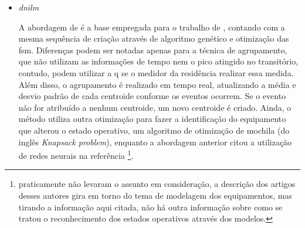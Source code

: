 \begin{enumerate}[label=\textbf{1.\arabic*},wide=\parindent]
\begin{enumerate}[label*=.\textbf{\arabic*},wide=\parindent]
\begin{itemize}[wide=\parindent]
\begin{equation}\label{eq:shannon}
Q_{shannon} = - \Delta{e_{i}} \log{|\Delta{e_{i}}|}
\end{equation}

Os melhores caminhos operativos para as \glspl{fsm} ainda precisam ser
resolvidos quanto aos centroides que pertencem a mais de um equipamento.
Para isso, \cite{nilm_baranski_summary_2004_21} cita resumidamente um
algoritmo de força bruta que irá investigar para cada sobreposição
qual caminho tem a melhor qualidade.

Os autores revelam que o método necessita de 5 a 10 dias para
encontrar os modelos dos equipamentos típicos, enquanto dados diários
são suficientes para atualizar o catálogo de equipamentos detectados em
cada residência. Os resultados mostram que os equipamentos de maiores
consumo, como geladeira, aquecedor elétrico (de fluxo) e fogão podem
ser detectados com eficiência.

\item \emph{\gls{dnilm}}

A abordagem de \citeauthor*{nilm_baranski_summary_2004_21} é a base
empregada para o trabalho de \citet*{nilm_bergman_distribuido_2011},
contando com a mesma sequência de criação através de algoritmo
genético e otimização das \gls{fsm}. Diferenças podem ser notadas
apenas para a técnica de agrupamento, que não utilizam as informações
de tempo nem o pico atingido no transitório, contudo, podem utilizar a
\gls{q} se o medidor da residência realizar essa medida. Além disso, o
agrupamento é realizado em tempo real, atualizando a média e desvio
padrão de cada centroide conforme os eventos ocorrem. Se o evento não
for atribuído a nenhum centroide, um novo centroide é criado. Ainda, o
método utiliza outra otimização para fazer a identificação do equipamento
que alterou o estado operativo, um algoritmo de otimização de mochila
(do inglês \emph{Knapsack problem}), enquanto a abordagem anterior
citou a utilização de redes neurais na referência
\cite{nilm_baranski_genetic_base_2003_19}\footnote{
\citeauthor*{nilm_baranski_genetic_base_2003_19}
praticamente não levaram o assunto em consideração, a descrição dos
artigos desses autores gira em torno do tema de modelagem dos
equipamentos, mas tirando a informação aqui citada, não há outra
informação sobre como se tratou o reconhecimento dos estados
operativos através dos modelos.}.


\end{itemize}
\end{enumerate}
\end{enumerate}
